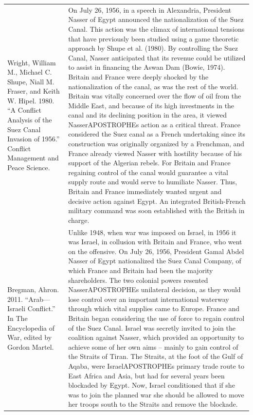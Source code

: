 {\begin{longtable}{p{}p{}}
Wright, William M., Michael C. Shupe, Niall M. Fraser, and Keith W. Hipel. 1980. “A Conflict Analysis of the Suez Canal Invasion of 1956.” Conflict Management and Peace Science. & On July 26, 1956, in a speech in Alexandria, President Nasser of Egypt announced the nationalization of the Suez Canal. This action was the climax of international tensions that have previously been studied using a game theoretic approach by Shupe et al. (1980). By controlling the Suez Canal, Nasser anticipated that its revenue could be utilized to assist in financing the Aswan Dam (Bowie, 1974). Britain and France were deeply shocked by the nationalization of the canal, as was the rest of the world. Britain was vitally concerned over the flow of oil from the Middle East, and because of its high investments in the canal and its declining position in the area, it viewed NasserAPOSTROPHEs action as a critical threat. France considered the Suez canal as a French undertaking since its construction was originally organized by a Frenchman, and France already viewed Nasser with hostility because of his support of the Algerian rebels. For Britain and France regaining control of the canal would guarantee a vital supply route and would serve to humiliate Nasser. Thus, Britain and France immediately wanted urgent and decisive action against Egypt. An integrated British-French military command was soon established with the British in charge.
\\
Bregman, Ahron. 2011. “Arab—Israeli Conflict.” In The Encyclopedia of War, edited by Gordon Martel. & Unlike 1948, when war was imposed on Israel, in 1956 it was Israel, in collusion with Britain and France, who went on the offensive. On July 26, 1956, President Gamal Abdel Nasser of Egypt nationalized the Suez Canal Company, of which France and Britain had been the majority shareholders. The two colonial powers resented NasserAPOSTROPHEs unilateral decision, as they would lose control over an important international waterway through which vital supplies came to Europe. France and Britain began considering the use of force to regain control of the Suez Canal. Israel was secretly invited to join the coalition against Nasser, which provided an opportunity to achieve some of her own aims – mainly to gain control of the Straits of Tiran. The Straits, at the foot of the Gulf of Aqaba, were IsraelAPOSTROPHEs primary trade route to East Africa and Asia, but had for several years been blockaded by Egypt. Now, Israel conditioned that if she was to join the planned war she should be allowed to move her troops south to the Straits and remove the blockade.

\end{longtable}}
